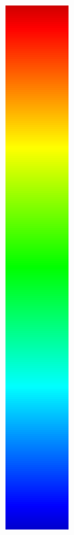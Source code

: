 \begin{description}
\begin{figure}[htb]
			  \includegraphics[angle=270, width=\linewidth, totalheight=1em, frame]{./content/pictures/rainbow.png}

\end{figure}
\end{description}
